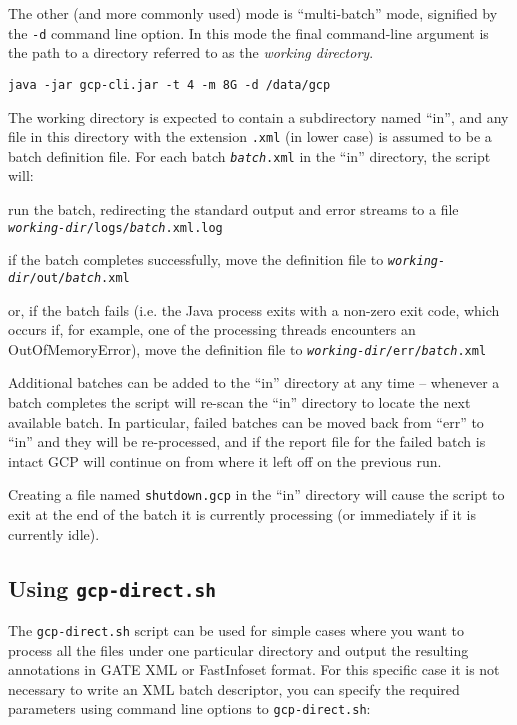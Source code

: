 The other (and more commonly used) mode is ``multi-batch'' mode, signified by
the \verb!-d! command line option.  In this mode the final command-line
argument is the path to a directory referred to as the {\em working directory}.
\begin{verbatim}
java -jar gcp-cli.jar -t 4 -m 8G -d /data/gcp
\end{verbatim}

The working directory is expected to contain a subdirectory named ``in'', and
any file in this directory with the extension \verb!.xml! (in lower case) is
assumed to be a batch definition file.  For each batch {\tt {\it batch}.xml} in
the ``in'' directory, the script will:

\bit
\item run the batch, redirecting the standard output and error streams to a
  file {\tt {\it working-dir}/logs/{\it batch}.xml.log}
\item if the batch completes successfully, move the definition file to
  {\tt {\it working-dir}/out/{\it batch}.xml}
\item or, if the batch fails (i.e. the Java process exits with a non-zero exit
  code, which occurs if, for example, one of the processing threads encounters
  an OutOfMemoryError), move the definition file to
  {\tt {\it working-dir}/err/{\it batch}.xml}
\eit

Additional batches can be added to the ``in'' directory at any time -- whenever
a batch completes the script will re-scan the ``in'' directory to locate the
next available batch.  In particular, failed batches can be moved back from
``err'' to ``in'' and they will be re-processed, and if the report file for the
failed batch is intact GCP will continue on from where it left off on the
previous run.

Creating a file named \verb!shutdown.gcp! in the ``in'' directory will cause
the script to exit at the end of the batch it is currently processing (or
immediately if it is currently idle).


\subsection{Using {\tt gcp-direct.sh}}
\label{sec:running:gcp-direct}

The \verb!gcp-direct.sh! script can be used for simple cases where you want to
process all the files under one particular directory and output the resulting
annotations in GATE XML or FastInfoset format.  For this specific case it is
not necessary to write an XML batch descriptor, you can specify the required
parameters using command line options to \verb!gcp-direct.sh!:

